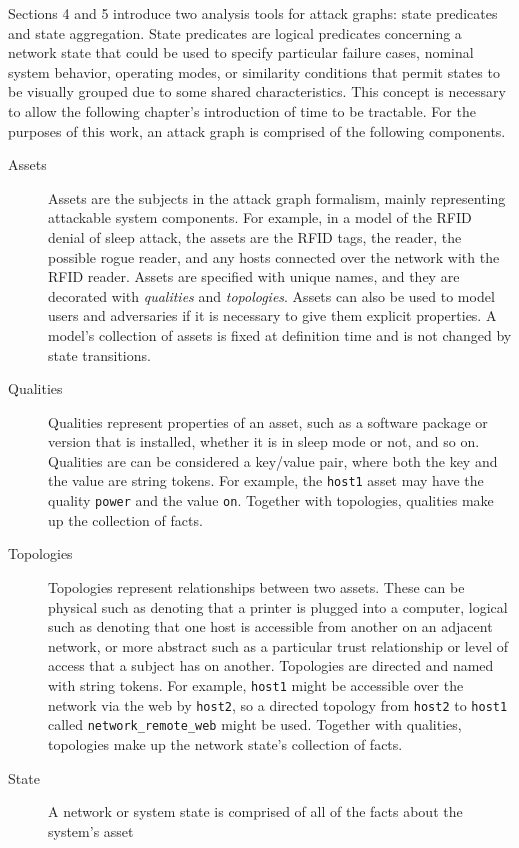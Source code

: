 Sections 4 and 5 introduce two analysis tools for attack graphs: state predicates and state
aggregation. State predicates are logical predicates concerning a network state that could
be used to specify particular failure cases, nominal system behavior, operating modes,
or similarity conditions that permit states to be visually grouped due to some shared characteristics.
This concept is necessary to allow the following chapter's introduction of time to be tractable.
For the purposes of this work, an attack graph is comprised of the following components.
\begin{description}
	\item[Assets] Assets are the subjects in the attack graph formalism, mainly representing
		attackable system components. For example, in a model of the RFID denial of sleep
		attack, the assets are the RFID tags, the reader, the possible rogue reader,
		and any hosts connected over the network with the RFID reader. Assets are specified
		with unique names, and they are decorated with \emph{qualities} and \emph{topologies}.
		Assets can also be used to model users and adversaries if it is necessary to give them
		explicit properties. A model's collection of assets is fixed at definition time and
		is not changed by state transitions.
	\item[Qualities] Qualities represent properties of an asset, such as a software package or
		version that is installed, whether it is in sleep mode or not, and so on. Qualities are
		can be considered a key/value pair, where both the key and the value are string tokens. For
		example, the \texttt{host1} asset may have the quality \texttt{power} and the value \texttt{on}.
		Together with topologies, qualities make up the collection of facts.
	\item[Topologies] Topologies represent relationships between two assets. These can be physical such
		as denoting that a printer is plugged into a computer, logical such as denoting that one
		host is accessible from another on an adjacent network, or more abstract such as a particular
		trust relationship or level of access that a subject has on another. Topologies are directed and
		named with string tokens. For example, \texttt{host1} might be accessible over the network via the
		web by \texttt{host2}, so a directed topology from \texttt{host2} to \texttt{host1} called
		\texttt{network\_remote\_web} might be used. Together with qualities, topologies make up the
		network state's collection of facts.
	\item[State] A network or system state is comprised of all of the facts about the system's asset

\end{description}
